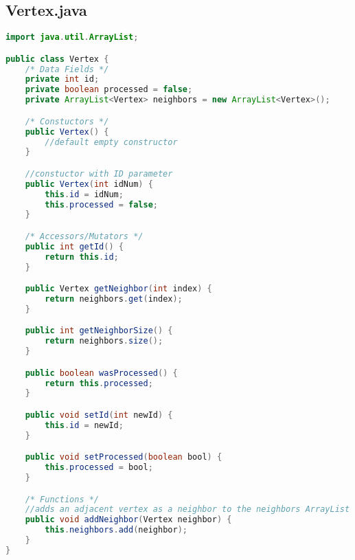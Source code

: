 \documentclass[letterpaper, 10pt,DIV=13]{scrartcl}
\numberwithin{equation}{section} %
\numberwithin{figure}{section} %
\numberwithin{table}{section} %
\begin{document}
\subsection{Vertex.java}
\begin{lstlisting}[frame=single, language=java, breaklines]  
import java.util.ArrayList;

public class Vertex {
    /* Data Fields */
    private int id;
    private boolean processed = false;
    private ArrayList<Vertex> neighbors = new ArrayList<Vertex>();

    /* Constuctors */
    public Vertex() {
        //default empty constructor
    }

    //constuctor with ID parameter
    public Vertex(int idNum) {
        this.id = idNum;
        this.processed = false;
    }

    /* Accessors/Mutators */
    public int getId() {
        return this.id;
    }

    public Vertex getNeighbor(int index) {
        return neighbors.get(index);
    }

    public int getNeighborSize() {
        return neighbors.size();
    }

    public boolean wasProcessed() {
        return this.processed;
    }

    public void setId(int newId) {
        this.id = newId;
    }

    public void setProcessed(boolean bool) {
        this.processed = bool;
    }

    /* Functions */
    //adds an adjacent vertex as a neighbor to the neighbors ArrayList
    public void addNeighbor(Vertex neighbor) {
        this.neighbors.add(neighbor);
    }
}
\end{lstlisting}
\end{document}
